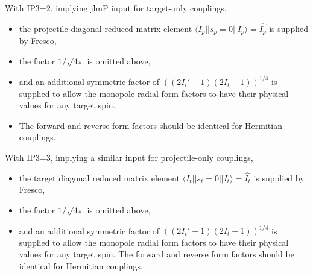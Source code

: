 \documentclass[11pt]{article}
\begin{document}
With IP3=2, implying jlmP input for target-only couplings,
\begin{itemize}
\item
 the projectile diagonal reduced matrix element
$\langle I_p||s_p=0||I_p\rangle = \hat{I_p}$ is supplied by Fresco,
\item
the factor $1/\sqrt{4\pi}$ is omitted above,
\item
and an additional symmetric factor of
$((2I_t'+1)(2I_t+1))^{1/4}$
is supplied to allow the
monopole radial form factors to have their physical
values for any target spin.
\item
The forward and reverse form factors should be identical for Hermitian couplings.

\end{itemize}
With IP3=3, implying a similar input for projectile-only couplings,
\begin{itemize}
\item
 the target diagonal reduced matrix element
 $\langle I_t||s_t=0||I_t\rangle = \hat{I_t}$ is supplied by Fresco,
 \item
 the factor $1/\sqrt{4\pi}$ is omitted above,
 \item
 and an additional symmetric factor of $((2I_t'+1)(2I_t+1))^{1/4}$
 is supplied to allow the monopole radial form factors to have their physical
 values for any target spin.
 The forward and reverse form factors should be identical for Hermitian couplings.
\end{itemize}

%
\end{document}
